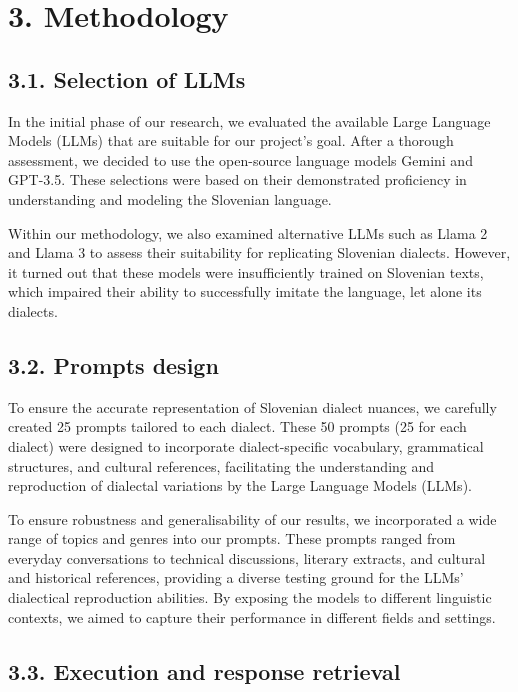 \documentclass[fleqn,moreauthors,10pt]{ds_report}
\begin{document}

\section{3. Methodology}

\subsection{3.1. Selection of LLMs}

    In the initial phase of our research, we evaluated the available Large Language Models (LLMs) that are suitable for our project's goal. After a thorough assessment, we decided to use the open-source language models Gemini and GPT-3.5. These selections were based on their demonstrated proficiency in understanding and modeling the Slovenian language.

    Within our methodology, we also examined alternative LLMs such as Llama 2 and Llama 3 to assess their suitability for replicating Slovenian dialects. However, it turned out that these models were insufficiently trained on Slovenian texts, which impaired their ability to successfully imitate the language, let alone its dialects.
    
\subsection{3.2. Prompts design}

    To ensure the accurate representation of Slovenian dialect nuances, we carefully created 25 prompts tailored to each dialect. These 50 prompts (25 for each dialect) were designed to incorporate dialect-specific vocabulary, grammatical structures, and cultural references, facilitating the understanding and reproduction of dialectal variations by the Large Language Models (LLMs). 
    
    To ensure robustness and generalisability of our results, we incorporated a wide range of topics and genres into our prompts. These prompts ranged from everyday conversations to technical discussions, literary extracts, and cultural and historical references, providing a diverse testing ground for the LLMs' dialectical reproduction abilities. By exposing the models to different linguistic contexts, we aimed to capture their performance in different fields and settings.
    
\subsection{3.3. Execution and response retrieval}
\end{document}
